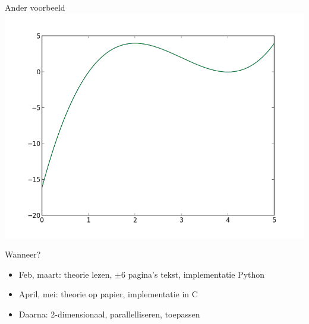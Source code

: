 \documentclass{beamer}
\begin{document}
\begin{frame}{Ander voorbeeld}
{  \includegraphics[width=0.5\linewidth]{24.png}}
\end{frame}

\begin{frame}{Wanneer?}
  \begin{itemize}
    \item[\checkmark] Feb, maart: theorie lezen, $\pm 6$ pagina's tekst, implementatie Python \pause
    \item April, mei: theorie op papier, implementatie in C \pause
    \item Daarna: 2-dimensionaal, parallelliseren, toepassen
  \end{itemize}
\end{frame}
\end{document}
